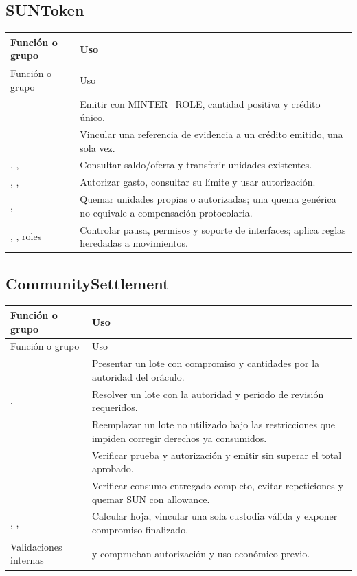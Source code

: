 \subsection{SUNToken}
\begin{longtable}{L{.37\linewidth}L{.53\linewidth}}
\toprule Función o grupo & Uso \\ \midrule\endfirsthead
\toprule Función o grupo & Uso \\ \midrule\endhead
{} & Emitir con MINTER\_ROLE, cantidad positiva y crédito único.\\
 & Vincular una referencia de evidencia a un crédito emitido, una sola vez.\\
, ,  & Consultar saldo/oferta y transferir unidades existentes.\\
, ,  & Autorizar gasto, consultar su límite y usar autorización.\\
,  & Quemar unidades propias o autorizadas; una quema genérica no equivale a compensación protocolaria.\\
, , roles & Controlar pausa, permisos y soporte de interfaces;  aplica reglas heredadas a movimientos.\\
\bottomrule
\end{longtable}
\subsection{CommunitySettlement}
\begin{longtable}{L{.37\linewidth}L{.53\linewidth}}
\toprule Función o grupo & Uso \\ \midrule\endfirsthead
\toprule Función o grupo & Uso \\ \midrule\endhead
{} & Presentar un lote con compromiso y cantidades por la autoridad del oráculo.\\
,  & Resolver un lote con la autoridad y periodo de revisión requeridos.\\
 & Reemplazar un lote no utilizado bajo las restricciones que impiden corregir derechos ya consumidos.\\
 & Verificar prueba y autorización y emitir sin superar el total aprobado.\\
 & Verificar consumo entregado completo, evitar repeticiones y quemar SUN con allowance.\\
, ,  & Calcular hoja, vincular una sola custodia válida y exponer compromiso finalizado.\\
Validaciones internas &  y  comprueban autorización y uso económico previo.\\
\bottomrule
\end{longtable}
